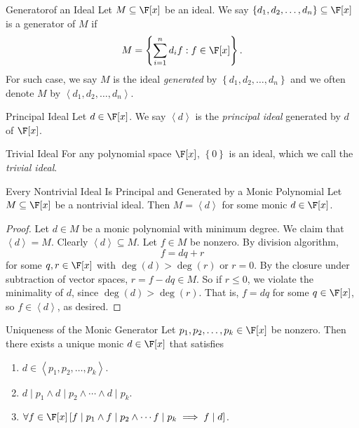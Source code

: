 \documentclass[linearalgebraII]{subfiles}
\begin{document}
    \begin{definition}{Generator}{of an Ideal}
        Let $M\subseteq \F[x]$ be an ideal. We say $\left\lbrace d_1, d_2, \ldots, d_n \right\rbrace \subseteq \F[x]$ is a generator of $M$ if
        \begin{equation*}
            M = \left\lbrace \sum^{n}_{i=1} d_if : f\in \F[x] \right\rbrace.
        \end{equation*}
        For such case, we say $M$ is the ideal \emph{generated} by $\left\lbrace d_1, d_2, \ldots, d_n \right\rbrace$ and we often denote $M$ by $\left< d_1, d_2, \ldots, d_n \right>$.
    \end{definition}

    \begin{definition}{Principal Ideal}{}
        Let $d\in \F[x]$. We say $\left<d\right>$ is the \emph{principal ideal} generated by $d$ of $\F[x]$.
    \end{definition}

    \begin{definition}{Trivial Ideal}{}
        For any polynomial space $\F[x]$, $\left\lbrace 0 \right\rbrace$ is an ideal, which we call the \emph{trivial ideal}.
    \end{definition}

    \begin{prop}{Every Nontrivial Ideal Is Principal and Generated by a Monic Polynomial}
        Let $M\subseteq \F[x]$ be a nontrivial ideal. Then $M = \left<d\right>$ for some monic $d\in \F[x]$.
    \end{prop}

    \begin{proof}
        Let $d\in M$ be a monic polynomial with minimum degree. We claim that $\left< d \right> = M$. Clearly $\left< d \right> \subseteq M$. Let $f\in M$ be nonzero. By division algorithm,
        \begin{equation*}
            f = dq+r
        \end{equation*}
        for some $q,r\in \F[x]$ with $\deg(d) > \deg(r)$ or $r = 0$. By the closure under subtraction of vector spaces, $r = f-dq\in M$. So if $r\leq 0$, we violate the minimality of $d$, since $\deg(d) > \deg(r)$. That is, $f = dq$ for some $q\in \F[x]$, so $f\in \left< d \right>$, as desired. 
    \end{proof}

    \begin{cor}{Uniqueness of the Monic Generator}
        Let $p_1, p_2, \ldots, p_k\in \F[x]$ be nonzero. Then there exists a unique monic $d\in \F[x]$ that satisfies
        \begin{enumerate}
            \item $d\in \left< p_1, p_2, \ldots, p_k \right>$.  
            \item $d\mid p_1\land d\mid p_2\land \cdots \land d\mid p_k$.
            \item $\forall f\in \F[x] \left[ f\mid p_1\land f\mid p_2\land \cdots f\mid p_k \implies f\mid d \right]$. 
        \end{enumerate}
    \end{cor}	
\end{document}
